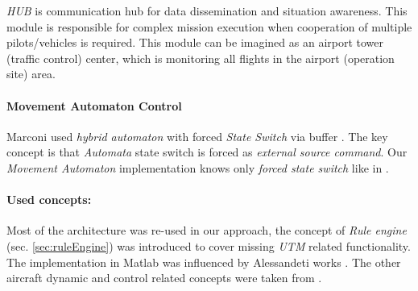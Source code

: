 \textit{HUB} is communication hub for data dissemination and situation awareness. This module is responsible for complex mission execution when cooperation of multiple pilots/vehicles is required. This module can be imagined as an airport tower (traffic control) center, which is monitoring all flights in the airport (operation site) area.

\paragraph{Movement Automaton Control} Marconi used \emph{hybrid automaton} with forced \emph{State Switch} via buffer \cite{marconi2009control}. The key concept is that \emph{Automata} state switch is forced as \emph{external source command}. Our \emph{Movement Automaton} implementation knows only \emph{forced state switch} like in \cite{frazzoli2000trajectory}. 

\paragraph{Used concepts:} Most of the architecture was re-used in our approach, the concept of \emph{Rule engine} (sec. \ref{sec:ruleEngine}) was introduced to cover missing \emph{UTM} related functionality. The implementation in Matlab was influenced by Alessandeti works \cite{allesandeti2016virtualArena,alessandrettinotes}. The other aircraft dynamic and control related concepts were taken from  \cite{stevens2015aircraft}.

